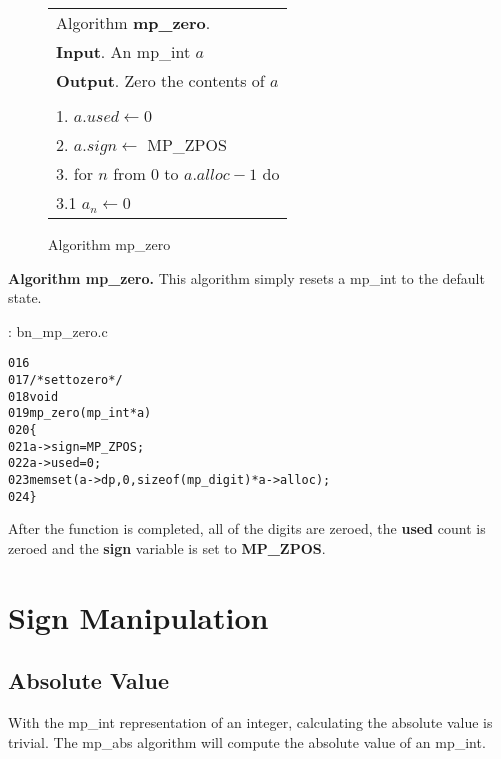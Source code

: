 \documentclass[b5paper]{book}
\begin{document}
\begin{figure}[here]
\begin{center}
\begin{tabular}{l}
\hline Algorithm \textbf{mp\_zero}. \\
\textbf{Input}.   An mp\_int $a$ \\
\textbf{Output}.  Zero the contents of $a$ \\
\hline \\
1.  $a.used \leftarrow 0$ \\
2.  $a.sign \leftarrow$ MP\_ZPOS \\
3.  for $n$ from 0 to $a.alloc - 1$ do \\
\hspace{3mm}3.1  $a_n \leftarrow 0$ \\
\hline
\end{tabular}
\end{center}
\caption{Algorithm mp\_zero}
\end{figure}

\textbf{Algorithm mp\_zero.}
This algorithm simply resets a mp\_int to the default state.  

\vspace{+3mm}\begin{small}
\hspace{-5.1mm}{\bf File}: bn\_mp\_zero.c
\vspace{-3mm}
\begin{alltt}
016   
017   /* set to zero */
018   void
019   mp_zero (mp_int * a)
020   \{
021     a->sign = MP_ZPOS;
022     a->used = 0;
023     memset (a->dp, 0, sizeof (mp_digit) * a->alloc);
024   \}
\end{alltt}
\end{small}

After the function is completed, all of the digits are zeroed, the \textbf{used} count is zeroed and the 
\textbf{sign} variable is set to \textbf{MP\_ZPOS}.

\section{Sign Manipulation}
\subsection{Absolute Value}
With the mp\_int representation of an integer, calculating the absolute value is trivial.  The mp\_abs algorithm will compute
the absolute value of an mp\_int.
\end{document}
